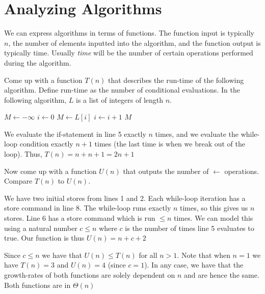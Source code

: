 \documentclass[main.tex]{subfiles}
\begin{document}
\section{Analyzing Algorithms}

We can express algorithms in terms of functions. The function input is typically \(n\), the number of elements inputted into the algorithm, and the function output is typically time. Usually \textit{time} will be the number of certain operations performed during the algorithm.

\begin{example}
	Come up with a function \(T(n)\) that describes the run-time of the following algorithm. Define run-time as the number of conditional evaluations. In the following algorithm, \(L\) is a list of integers of length \(n\).
	\begin{algorithmic}[1]
			\State \(M \gets -\infty\)
			\State \(i \gets 0\)
					\State \(M \gets L[i]\)
				\EndIf
				\State \(i \gets i+1\)
			\EndWhile
			\State \Return \(M\)
		\EndFunction
	\end{algorithmic}
	
	\begin{sol}
		We evaluate the if-statement in line 5 exactly \(n\) times, and we evaluate the while-loop condition exactly \(n+1\) times (the last time is when we break out of the loop). Thus, \(T(n) = n + n + 1 = 2n + 1\)
	\end{sol}
	
	Now come up with a function \(U(n)\) that outputs the number of \(\gets\) operations. Compare \(T(n)\) to \(U(n)\).
	
	\begin{sol}
		We have two initial stores from lines 1 and 2. Each while-loop iteration has a store command in line 8. The while-loop runs exactly \(n\) times, so this gives us \(n\) stores. Line 6 has a store command which is run \(\leq n\) times. We can model this using a natural number \(c \leq n\) where \(c\) is the number of times line 5 evaluates to true. Our function is thus \(U(n) = n + c + 2\)
		
		Since \(c \leq n\) we have that \(U(n) \leq T(n)\) for all \(n > 1\). Note that when \(n = 1\) we have \(T(n) = 3\) and \(U(n) = 4\) (since \(c = 1\)). In any case, we have that the growth-rates of both functions are solely dependent on \(n\) and are hence the same. Both functions are in \(\Theta(n)\)
	\end{sol}
\end{example}
\end{document}
